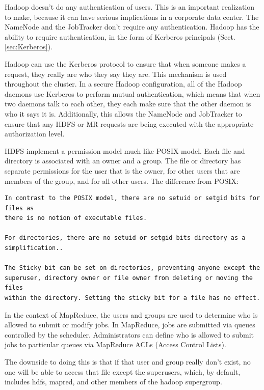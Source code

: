 Hadoop doesn't do any authentication of users. This is an important realization
to make, because it can have serious implications in a corporate data center.
The NameNode and the JobTracker don't require any authentication.
Hadoop has the ability to require authentication, in the form of Kerberos
principals (Sect.\ref{sec:Kerberos}). 

Hadoop can use the Kerberos protocol to ensure that when someone
makes a request, they really are who they say they are. This mechanism is used
throughout the cluster. In a secure Hadoop configuration, all of the Hadoop
daemons use Kerberos to perform mutual authentication, which means that when two
daemons talk to each other, they each make sure that the other daemon is who it
says it is. Additionally, this allows the NameNode and JobTracker to ensure that
any HDFS or MR requests are being executed with the appropriate authorization
level.

HDFS implement a permission model much like POSIX model. Each file and directory
is associated with an owner and a group. The file or directory has separate
permissions for the user that is the owner, for other users that are members of
the group, and for all other users.  The difference from POSIX:
\begin{verbatim}
In contrast to the POSIX model, there are no setuid or setgid bits for files as
there is no notion of executable files.

For directories, there are no setuid or setgid bits directory as a
simplification..

The Sticky bit can be set on directories, preventing anyone except the
superuser, directory owner or file owner from deleting or moving the files
within the directory. Setting the sticky bit for a file has no effect.
\end{verbatim}

In the context of MapReduce, the users and groups are used to determine who is
allowed to submit or modify jobs. In MapReduce, jobs are submitted via queues
controlled by the scheduler.
Administrators can define who is allowed to submit jobs to particular queues via
MapReduce ACLs (Access Control Lists).  


The downside to doing this is that if that user and group really don't exist, no
one will be able to access that file except the superusers, which, by default,
includes hdfs, mapred, and other members of the hadoop supergroup.  


% 

